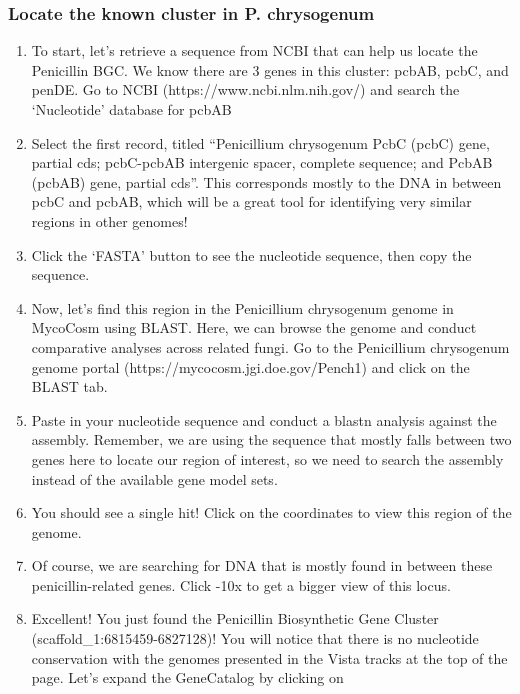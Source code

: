 \documentclass[
  letterpaper,
  DIV=11,
  numbers=noendperiod]{scrreprt}
\providecommand{\tightlist}{%
  \setlength{\itemsep}{0pt}\setlength{\parskip}{0pt}}
\begin{document}
\subsubsection*{Locate the known cluster in P.
chrysogenum}\label{locate-the-known-cluster-in-p.-chrysogenum}

\begin{enumerate}
\def\labelenumi{\arabic{enumi}.}
\tightlist
\item
  To start, let's retrieve a sequence from NCBI that can help us locate
  the Penicillin BGC. We know there are 3 genes in this cluster: pcbAB,
  pcbC, and penDE. Go to NCBI (https://www.ncbi.nlm.nih.gov/) and search
  the `Nucleotide' database for pcbAB
\item
  Select the first record, titled ``Penicillium chrysogenum PcbC (pcbC)
  gene, partial cds; pcbC-pcbAB intergenic spacer, complete sequence;
  and PcbAB (pcbAB) gene, partial cds''. This corresponds mostly to the
  DNA in between pcbC and pcbAB, which will be a great tool for
  identifying very similar regions in other genomes!
\item
  Click the `FASTA' button to see the nucleotide sequence, then copy the
  sequence.
\item
  Now, let's find this region in the Penicillium chrysogenum genome in
  MycoCosm using BLAST. Here, we can browse the genome and conduct
  comparative analyses across related fungi. Go to the Penicillium
  chrysogenum genome portal (https://mycocosm.jgi.doe.gov/Pench1) and
  click on the BLAST tab.
\item
  Paste in your nucleotide sequence and conduct a blastn analysis
  against the assembly. Remember, we are using the sequence that mostly
  falls between two genes here to locate our region of interest, so we
  need to search the assembly instead of the available gene model sets.
\item
  You should see a single hit! Click on the coordinates to view this
  region of the genome.
\item
  Of course, we are searching for DNA that is mostly found in between
  these penicillin-related genes. Click -10x to get a bigger view of
  this locus.
\item
  Excellent! You just found the Penicillin Biosynthetic Gene Cluster
  (scaffold\_1:6815459-6827128)! You will notice that there is no
  nucleotide conservation with the genomes presented in the Vista tracks
  at the top of the page. Let's expand the GeneCatalog by clicking on

\end{enumerate}
\end{document}
